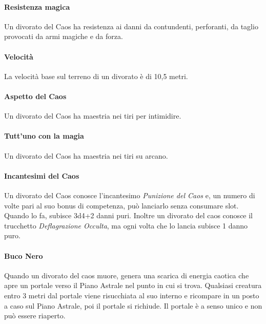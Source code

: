 \paragraph{Resistenza magica} Un divorato del Caos ha resistenza ai danni da contundenti, perforanti, da taglio provocati da armi magiche e da forza.
\paragraph{Velocità} La velocità base sul terreno di un divorato è di 10,5 metri.
\paragraph{Aspetto del Caos} Un divorato del Caos ha maestria nei tiri per intimidire.
\paragraph{Tutt'uno con la magia} Un divorato del Caos ha maestria nei tiri su arcano.
\paragraph{Incantesimi del Caos}Un divorato del Caos conosce l'incantesimo \textit{Punizione del Caos} e, un numero di volte pari al suo bonus di competenza, può lanciarlo senza consumare slot. Quando lo fa, subisce 3d4+2 danni puri. Inoltre un divorato del caos conosce il trucchetto \textit{Deflagrazione Occulta}, ma ogni volta che lo lancia subisce 1 danno puro.
\paragraph{Buco Nero} Quando un divorato del caos muore, genera una scarica di energia caotica che apre un portale verso il Piano Astrale nel punto in cui si trova. Qualsiasi creatura entro 3 metri dal portale viene risucchiata al suo interno e ricompare in un posto a caso sul Piano Astrale, poi il portale si richiude. Il portale è a senso unico e non può essere riaperto.

